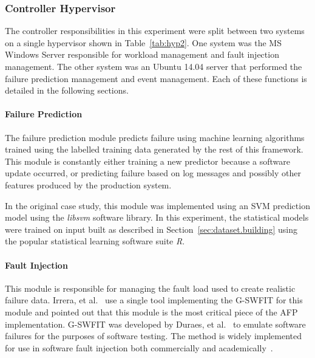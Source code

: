 \tabHypervisorOne
\tabHypervisorTwo

\setcounter{secnumdepth}{5}

\subsubsection{Controller Hypervisor} \label{sec:controller} %
The controller responsibilities in this experiment were split between two
systems on a single hypervisor shown in Table~\ref{tab:hyp2}.  One system was
the \ac{MS} Windows Server responsible for workload management and fault
injection management.  The other system was an Ubuntu 14.04 server that
performed the failure prediction management and event management.  Each of
these functions is detailed in the following sections.

\paragraph{Failure Prediction} \label{sec:failurePrediction} %
The failure prediction module predicts failure using machine learning
algorithms trained using the labelled training data generated by the rest of
this framework.  This module is constantly either training a new predictor
because a software update occurred, or predicting failure based on log messages
and possibly other features produced by the production system.

In the original case study, this module was implemented using an \ac{SVM}
prediction model using the \emph{libsvm} software library.  In this experiment,
the statistical models were trained on input built as described in
Section~\ref{sec:dataset.building} using the popular statistical learning
software suite \emph{R}.

\paragraph{Fault Injection} \label{sec:faultInjectionMgr}
This module is responsible for managing the fault load used to create realistic
failure data.  Irrera, et al.~\cite{irrera2015} use a single tool implementing
the \ac{G-SWFIT} for this module and pointed out that this module is the most
critical piece of the \ac{AFP} implementation.  \ac{G-SWFIT} was developed by
Duraes, et al.~\cite{gswfit} to emulate software failures for the purposes of
software testing.  The method is widely implemented for use in software fault
injection both commercially and
academically~\cite{cotroneo2012,irrera2014,natella2010,umadevi2015}.  

